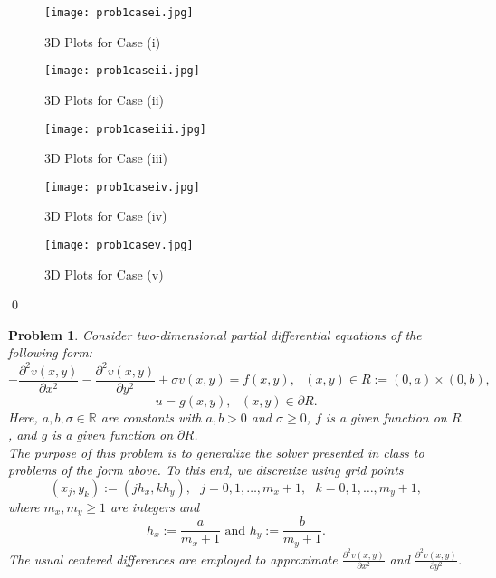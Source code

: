 \documentclass[12pt]{article}
\newtheorem{problem}{Problem}
\def\R{\mathbb{R}}
\begin{document}
\begin{itemize}
\begin{itemize}
\begin{figure}[H]
\center
\texttt{[image: prob1casei.jpg]}
\caption{3D Plots for Case (i)}
\end{figure}

\begin{figure}[H]
\center
\texttt{[image: prob1caseii.jpg]}
\caption{3D Plots for Case (ii)}
\end{figure}

\begin{figure}[H]
\center
\texttt{[image: prob1caseiii.jpg]}
\caption{3D Plots for Case (iii)}
\end{figure}

\begin{figure}[H]
\center
\texttt{[image: prob1caseiv.jpg]}
\caption{3D Plots for Case (iv)}
\end{figure}

\begin{figure}[H]
\center
\texttt{[image: prob1casev.jpg]}
\caption{3D Plots for Case (v)}
\end{figure}
\qed\\

\end{itemize}
\end{itemize}

\bigskip\bigskip
\noindent
\begin{problem} Consider two-dimensional partial differential equations of the following form:
$$-\frac{\partial^2 v(x,y)}{\partial x^2} - \frac{\partial^2 v(x,y)}{\partial y^2} +\sigma v(x,y) = f(x,y), \text{ } (x,y) \in R := (0,a)\times (0,b),$$
$$u = g(x,y), \text{ } (x,y) \in \partial R.$$
Here, $a, b, \sigma \in \R$ are constants with $a, b > 0$ and $\sigma \geq 0$, $f$ is a given function on $R$, and $g$ is a given function on $\partial R$.\\
The purpose of this problem is to generalize the solver presented in class to problems of the form above.  To this end, we discretize using grid points
$$(x_j,y_k) := (jh_x,kh_y), \text{ } j=0,1,\dots,m_x+1, \text{ } k=0,1,\dots,m_y+1,$$
where $m_x, m_y \geq 1$ are integers and
$$h_x := \frac{a}{m_x + 1} \text{ and } h_y := \frac{b}{m_y + 1}.$$
The usual centered differences are employed to approximate $\frac{\partial^2v(x,y)}{\partial x^2}$ and $\frac{\partial^2 v(x,y)}{\partial y^2}$.
\end{problem}
\end{document}
